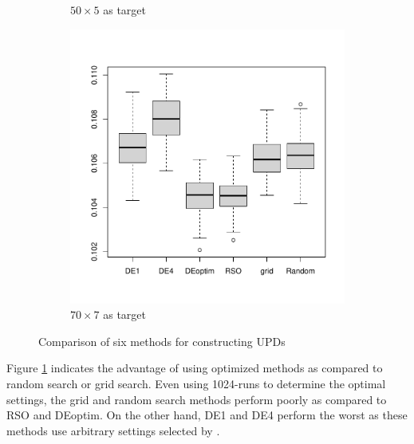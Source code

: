 \documentclass [PhD] {package/uclathes}
\begin{document}
\begin{figure}
\begin{subfigure}[b]{0.3\textwidth}
         \caption{$50\times 5$ as target}
     \end{subfigure}
     \hfill
     \begin{subfigure}[b]{0.3\textwidth}
         \centering
         \includegraphics[width=\textwidth]{chapters/RSO/pdfs/boxplots4}
         \caption{$70\times 7$ as target}
     \end{subfigure}
        \caption{Comparison of six methods for constructing UPDs}
        \label{fig:6methods}
\end{figure}

Figure \ref{fig:6methods} indicates the advantage of using optimized methods as compared to random search or grid search. Even using 1024-runs to determine the optimal settings, the grid and random search methods perform poorly as compared to RSO and DEoptim. On the other hand, DE1 and DE4 perform the worst as these methods use arbitrary settings selected by \textcite{stokes2023metaheuristic}.
\end{document}
